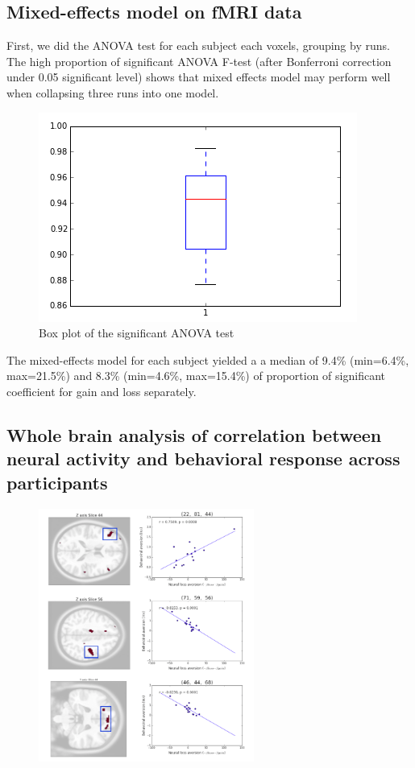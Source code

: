 \documentclass[11pt]{article}
\begin{document}
\subsection{Mixed-effects model on fMRI data}
First, we did the ANOVA test for each subject each voxels, grouping by runs. 
The high proportion of significant ANOVA F-test (after Bonferroni correction 
under 0.05 significant level) shows that mixed effects model may perform well 
when collapsing three runs into one model. 
\begin{figure}[H]
    \centering
        \includegraphics[scale=0.45]{figures/anova_prop.png}
\caption{Box plot of the significant ANOVA test}
\end{figure}
The mixed-effects model for each subject yielded a a median of 9.4\% (min=6.4\%, 
max=21.5\%) and 8.3\% (min=4.6\%, max=15.4\%) of proportion of significant 
coefficient for gain and loss separately. 

\newpage

\subsection{Whole brain analysis of correlation between neural activity and behavioral response across participants}

\begin{figure}
  \begin{center}
    \includegraphics[width=0.63\textwidth]{figures/Regression3/corr_neu_bah.png} 
  \end{center}
\end{figure}
\end{document}
